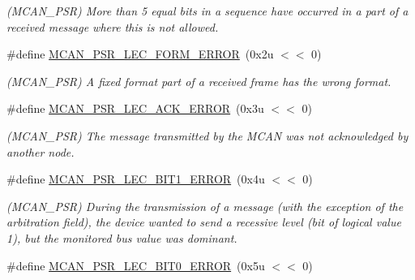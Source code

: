 \begin{DoxyCompactItemize}
\begin{DoxyCompactList}\small\item\em (M\+C\+A\+N\+\_\+\+P\+SR) More than 5 equal bits in a sequence have occurred in a part of a received message where this is not allowed. \end{DoxyCompactList}\item 
\mbox{\label{group__SAMV71__MCAN_ga550bbedda3c4a222985d9a35e429cbca}} 
\#define \mbox{\hyperlink{group__SAMV71__MCAN_ga550bbedda3c4a222985d9a35e429cbca}{M\+C\+A\+N\+\_\+\+P\+S\+R\+\_\+\+L\+E\+C\+\_\+\+F\+O\+R\+M\+\_\+\+E\+R\+R\+OR}}~(0x2u $<$$<$ 0)
\begin{DoxyCompactList}\small\item\em (M\+C\+A\+N\+\_\+\+P\+SR) A fixed format part of a received frame has the wrong format. \end{DoxyCompactList}\item 
\mbox{\label{group__SAMV71__MCAN_ga345a98596f6c9065ea629bd18709a5a0}} 
\#define \mbox{\hyperlink{group__SAMV71__MCAN_ga345a98596f6c9065ea629bd18709a5a0}{M\+C\+A\+N\+\_\+\+P\+S\+R\+\_\+\+L\+E\+C\+\_\+\+A\+C\+K\+\_\+\+E\+R\+R\+OR}}~(0x3u $<$$<$ 0)
\begin{DoxyCompactList}\small\item\em (M\+C\+A\+N\+\_\+\+P\+SR) The message transmitted by the M\+C\+AN was not acknowledged by another node. \end{DoxyCompactList}\item 
\mbox{\label{group__SAMV71__MCAN_ga7f20553a3490fa3d0ef383e0886df754}} 
\#define \mbox{\hyperlink{group__SAMV71__MCAN_ga7f20553a3490fa3d0ef383e0886df754}{M\+C\+A\+N\+\_\+\+P\+S\+R\+\_\+\+L\+E\+C\+\_\+\+B\+I\+T1\+\_\+\+E\+R\+R\+OR}}~(0x4u $<$$<$ 0)
\begin{DoxyCompactList}\small\item\em (M\+C\+A\+N\+\_\+\+P\+SR) During the transmission of a message (with the exception of the arbitration field), the device wanted to send a recessive level (bit of logical value \textquotesingle{}1\textquotesingle{}), but the monitored bus value was dominant. \end{DoxyCompactList}\item 
\mbox{\label{group__SAMV71__MCAN_gacfd447aedf3a1ae093e752d36eea60ab}} 
\#define \mbox{\hyperlink{group__SAMV71__MCAN_gacfd447aedf3a1ae093e752d36eea60ab}{M\+C\+A\+N\+\_\+\+P\+S\+R\+\_\+\+L\+E\+C\+\_\+\+B\+I\+T0\+\_\+\+E\+R\+R\+OR}}~(0x5u $<$$<$ 0)

\end{DoxyCompactItemize}
